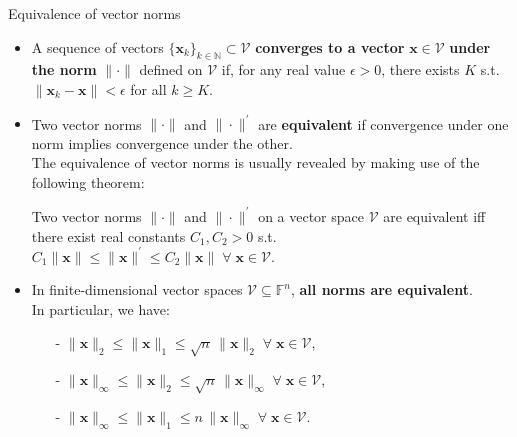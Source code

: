 \documentclass[t,usepdftitle=false]{beamer}
\begin{document}
\begin{frame}{Equivalence of vector norms}
\begin{itemize}
\item A sequence of vectors $\{\mathbf{x}_k\}_{k\in\mathbb{N}}\subset \mathcal{V}$ \textbf{converges to a vector} $\mathbf{x}\in \mathcal{V}$ \textbf{under the norm} $\|\cdot\|$ defined on $\mathcal{V}$ if, for any real value $\epsilon>0$, there exists $K$ s.t. $\!\|\mathbf{x}_k-\mathbf{x}\|<\epsilon$ for all $k\geq K$.
\item Two vector norms $\|\cdot\|$ and $\|\cdot\|^\prime$ are \textbf{equivalent} if convergence under one norm implies convergence under the other.\\
The equivalence of vector norms is usually revealed by making use of the following theorem:
\begin{theorem}
Two vector norms $\|\cdot\|$ and $\|\cdot\|^\prime$ on a vector space $\mathcal{V}$ are equivalent iff there exist real constants $C_1,C_2>0$ s.t. $\!C_1\|\mathbf{x}\|\leq\|\mathbf{x}\|^\prime\leq C_2\|\mathbf{x}\|\;\forall\;\mathbf{x}\in \mathcal{V}$.
\end{theorem}
\item In finite-dimensional vector spaces $\mathcal{V}\subseteq \mathbb{F}^n$, \textbf{all norms are equivalent}.\\
In particular, we have:\tinyskip\\
\hspace{3.2cm}\begin{minipage}{0.5\textwidth}
\begin{itemize}
\item[-] $\|\mathbf{x}\|_2\leq\|\mathbf{x}\|_1\leq \sqrt{n}\,\|\mathbf{x}\|_2\;\forall\;\mathbf{x}\in \mathcal{V}$,
\item[-] $\|\mathbf{x}\|_\infty\leq\|\mathbf{x}\|_2\leq \sqrt{n}\,\|\mathbf{x}\|_\infty\;\forall\;\mathbf{x}\in \mathcal{V}$,
\item[-] $\|\mathbf{x}\|_\infty\leq\|\mathbf{x}\|_1\leq n\,\|\mathbf{x}\|_\infty\;\forall\;\mathbf{x}\in \mathcal{V}$.
\end{itemize}
\end{minipage}
\end{itemize}
\end{frame}
\end{document}
